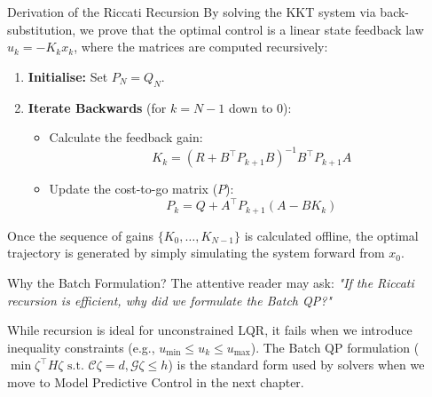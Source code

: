 \begin{summarybox}{Derivation of the Riccati Recursion}
	By solving the KKT system via back-substitution, we prove that the optimal control is a linear state feedback law $u_k = -K_k x_k$, where the matrices are computed recursively:
	
	\begin{enumerate}
		\item \textbf{Initialise:} Set $P_N = Q_N$.
		\item \textbf{Iterate Backwards} (for $k = N-1$ down to $0$):
		\begin{itemize}
			\item Calculate the feedback gain:
			\[ K_k = (R + B^\top P_{k+1} B)^{-1} B^\top P_{k+1} A \]
			\item Update the cost-to-go matrix ($P$):
			\[ P_k = Q + A^\top P_{k+1} (A - B K_k) \]
		\end{itemize}
	\end{enumerate}
	
	Once the sequence of gains $\{K_0, \dots, K_{N-1}\}$ is calculated offline, the optimal trajectory is generated by simply simulating the system forward from $x_0$.
\end{summarybox}

\begin{notebox}{Why the Batch Formulation?}
	The attentive reader may ask: \textit{"If the Riccati recursion is efficient, why did we formulate the Batch QP?"}
	
	While recursion is ideal for unconstrained LQR, it fails when we introduce inequality constraints (e.g., $u_{\min} \le u_k \le u_{\max}$). The Batch QP formulation ($ \min \zeta^\top H \zeta \text{ s.t. } \mathcal{C}\zeta=d, \mathcal{G}\zeta \le h$) is the standard form used by solvers when we move to Model Predictive Control in the next chapter.
\end{notebox}

